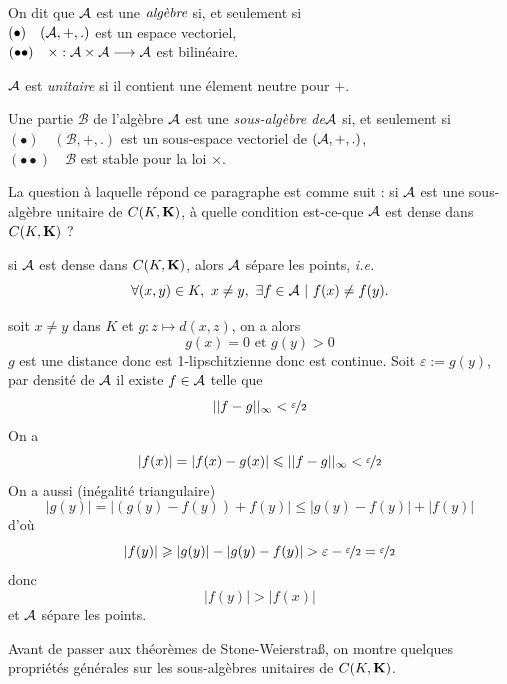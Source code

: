 \documentclass[a4paper,11pt, twoside]{article}
\begin{document}
\begin{Def}
  On dit que $\mathcal A$ est une $\emph{algèbre}$ si, et seulement si\\
  $(\bullet)\quad (\mathcal A,+,.)$ est un espace vectoriel,\\
  $(\bullet\bullet)\quad \times : \mathcal A\times\mathcal A\longrightarrow\mathcal A$ est bilinéaire.
\end{Def}


$\mathcal A$ est \emph{unitaire} si il contient une élement neutre pour $+$.


\begin{Def}
  Une partie $\mathcal B$ de l'algèbre $\mathcal A$ est une \emph{sous-algèbre de}$\mathcal A$ si, et seulement si\\
  $(\bullet)\quad (\mathcal B,+,.)$ est un sous-espace vectoriel de $(\mathcal A,+,.)$,\\
  $(\bullet\bullet)\quad \mathcal B$ est stable pour la loi $\times$.\\
\end{Def}

La question à laquelle répond ce paragraphe est comme suit : si $\mathcal A$ est une sous-algèbre unitaire de $C(K,\mathbf K)$, à quelle condition est-ce-que $\mathcal A$ est dense dans $C(K,\mathbf K)$ ?\\[1em]


\begin{RQ}
  si $\mathcal A$ est dense dans $C(K,\mathbf K)$, alors $\mathcal A$ sépare les points, \emph{i.e.}
  $$\forall (x,y)\in K,\ x\neq y,\ \exists f\in\A\ |\ f(x)\neq f(y).$$
\end{RQ}


\begin{Proof}
  soit $x\neq y$ dans $K$ et $g:z\longmapsto d(x,z)$, on a alors 
  $$g(x)=0\text{ et }g(y)>0$$
  $g$ est une distance donc est 1-lipschitzienne donc est continue. Soit $\varepsilon:=g(y)$, par densité de $\mathcal A$ il existe $f\in \mathcal A$ telle que 
  $$||f-g||_{\infty}<\displaystyle\nicefrac{\varepsilon}{2}$$
  On a 
  $$|f(x)|=|f(x)-g(x)|\leqslant||f-g||_{\infty}<\displaystyle\nicefrac{\varepsilon}{2}$$
  On a aussi (inégalité triangulaire)
  $$|g(y)|=|(g(y)-f(y))+f(y)|\leqslant|g(y)-f(y)|+|f(y)|$$
  d'où
  $$|f(y)|\geqslant |g(y)|-|g(y)-f(y)|>\varepsilon-\dstyle\nicefrac{\varepsilon}{2}=\dstyle\nicefrac{\varepsilon}{2}$$
  donc 
  $$|f(y)|>|f(x)|$$
  et $\mathcal A$ sépare les points.
\end{Proof}


Avant de passer aux théorèmes de Stone-Weierstra\ss, on montre quelques propriétés générales sur les sous-algèbres unitaires de $C(K,\mathbf K)$.
\end{document}
